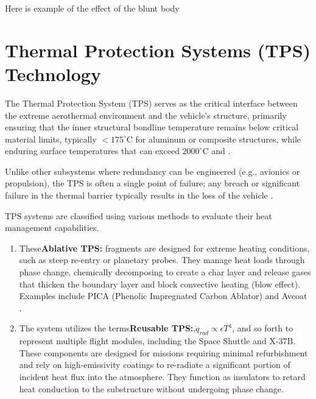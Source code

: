 Here is example of the effect of the blunt body~\cite{aerospace9120800BluntBodyTheory}

\section{Thermal Protection Systems (TPS) Technology}

\par
The Thermal Protection System (TPS) serves as the critical interface between the extreme aerothermal environment and the vehicle's structure, primarily ensuring that the inner structural bondline temperature remains below critical material limits, typically $< 175^\circ$C for aluminum or composite structures, while enduring surface temperatures that can exceed $2000^\circ$C and \cite{TPS-stateofIndustryNASA}.
\par
Unlike other subsystems where redundancy can be engineered (e.g., avionics or propulsion), the TPS is often a single point of failure; any breach or significant failure in the thermal barrier typically results in the loss of the vehicle \cite{AndersonHypersonic}.

TPS systems are classified using various methods to evaluate their heat management capabilities.

\begin{enumerate}
    \item These\textbf{Ablative TPS:} fragments are designed for extreme heating conditions, such as steep re-entry or planetary probes. They manage heat loads through phase change, chemically decomposing to create a char layer and release gases that thicken the boundary layer and block convective heating (blow effect). Examples include PICA (Phenolic Impregnated Carbon Ablator) and Avcoat \cite{TPS-stateofIndustryNASA}.

    \item The system utilizes the terms\textbf{Reusable TPS:},$\dot{q}_{rad} \propto \epsilon T^4$, and so forth to represent multiple flight modules, including the Space Shuttle and X-37B. These components are designed for missions requiring minimal refurbishment and rely on high-emissivity coatings to re-radiate a significant portion of incident heat flux into the atmosphere. They function as insulators to retard heat conduction to the substructure without undergoing phase change.
\end{enumerate}


